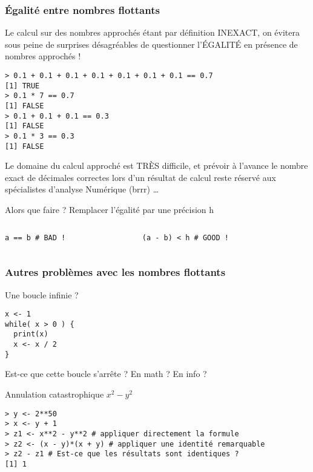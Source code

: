\documentclass[10pt]{beamer}
\begin{document}
\begin{frame}[fragile]
  \frametitle{Égalité entre nombres flottants}
  Le calcul sur des nombres approchés étant par définition \alert{INEXACT}, on évitera sous peine de surprises désagréables de questionner l'\alert{ÉGALITÉ} en présence de nombres approchés !
  \begin{lstlisting}
> 0.1 + 0.1 + 0.1 + 0.1 + 0.1 + 0.1 + 0.1 == 0.7
[1] TRUE
> 0.1 * 7 == 0.7
[1] FALSE
> 0.1 + 0.1 + 0.1 == 0.3
[1] FALSE
> 0.1 * 3 == 0.3
[1] FALSE    
\end{lstlisting}

Le domaine du calcul approché est TRÈS difficile, et prévoir à l'avance le nombre exact de décimales correctes lors d'un résultat de calcul reste réservé aux spécialistes d'analyse Numérique (brrr) \dots

\begin{block}{Alors que faire ? Remplacer l'égalité par une précision h}
\begin{columns}[t]
\begin{column}{0.48\textwidth}
  \begin{lstlisting}[style=editor]
a == b # BAD !
  \end{lstlisting}
\end{column}
\begin{column}{0.48\textwidth}
  \begin{lstlisting}[style=editor]
(a - b) < h # GOOD !    
  \end{lstlisting}
\end{column}
\end{columns}
  
\end{block}

\end{frame}

\begin{frame}[fragile]
  \frametitle{Autres problèmes avec les nombres flottants}


  \begin{exampleblock}{Une boucle infinie ?}
  \begin{lstlisting}[style=edblock]
x <- 1
while( x > 0 ) {
  print(x)
  x <- x / 2
}
\end{lstlisting}
Est-ce que cette boucle s'arrête ? En math ? En info ? 
\end{exampleblock}


\begin{exampleblock}{Annulation catastrophique $x^2 - y^2$}
  \begin{lstlisting}[style=block]
> y <- 2**50
> x <- y + 1
> z1 <- x**2 - y**2 # appliquer directement la formule
> z2 <- (x - y)*(x + y) # appliquer une identité remarquable
> z2 - z1 # Est-ce que les résultats sont identiques ?
[1] 1    
  \end{lstlisting}
\end{exampleblock}

\end{frame}
\end{document}
